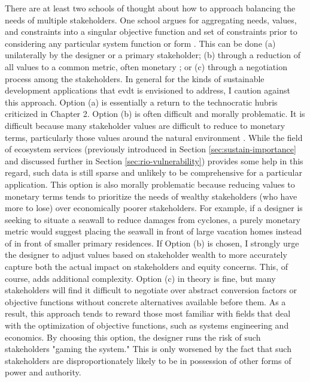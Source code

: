 There are at least two schools of thought about how to approach balancing the needs of multiple stakeholders. One school argues for aggregating needs, values, and constraints into a singular objective function and set of constraints prior to considering any particular system function or form \cite{hazelriggFundamentalsDecisionMaking2012}. This can be done (a) unilaterally by the designer or a primary stakeholder; (b) through a reduction of all values to a common metric, often monetary \cite{viscusiEconomicsRegulationAntitrust2018}; or (c) through a negotiation process among the stakeholders. In general for the kinds of sustainable development applications that \ac{evdt} is envisioned to address, I caution against this approach. Option (a) is essentially a return to the technocratic hubris criticized in Chapter 2. Option (b) is often difficult and morally problematic. It is difficult because many stakeholder values are difficult to reduce to monetary terms, particularly those values around the natural environment \cite{ackermanPricingPricelessCostBenefit2001}. While the field of ecosystem services (previously introduced in Section \ref{sec:sustain-importance} and discussed further in Section \ref{sec:rio-vulnerability}) provides some help in this regard, such data is still sparse and unlikely to be comprehensive for a particular application. This option is also morally problematic because reducing values to monetary terms tends to prioritize the needs of wealthy stakeholders (who have more to lose) over economically poorer stakeholders. For example, if a designer is seeking to situate a seawall to reduce damages from cyclones, a purely monetary metric would suggest placing the seawall in front of large vacation homes instead of in front of smaller primary residences. If Option (b) is chosen, I strongly urge the designer to adjust values based on stakeholder wealth to more accurately capture both the actual impact on stakeholders and equity concerns. This, of course, adds additional complexity. Option (c) in theory is fine, but many stakeholders will find it difficult to negotiate over abstract conversion factors or objective functions without concrete alternatives available before them. As a result, this approach tends to reward those most familiar with fields that deal with the optimization of objective functions, such as systems engineering and economics. By choosing this option, the designer runs the risk of such stakeholders "gaming the system." This is only worsened by the fact that such stakeholders are disproportionately likely to be in possession of other forms of power and authority.

